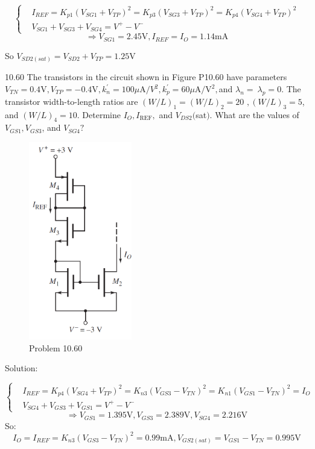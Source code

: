 \documentclass[a4paper,11pt,UTF8]{article}
\begin{document}
$$\left\{
\begin{aligned}
	&I_{REF}=K_{p1}(V_{SG1}+V_{TP})^2=K_{p3}(V_{SG3}+V_{TP})^2=K_{p4}(V_{SG4}+V_{TP})^2\\
	&V_{SG1}+V_{SG3}+V_{SG4}=V^+-V^-
\end{aligned}\right.
$$
$$
	\Rightarrow V_{SG1}=2.45\mathrm{V},I_{REF}=I_O=1.14\mathrm{mA}
$$

So $V_{SD2(sat)}=V_{SD2}+V_{TP}=1.25$V

10.60 The transistors in the circuit shown in Figure P10.60 have parameters $V_{TN}= 0.4$V$, V_{TP}= - 0.4$V$, k_n^{\prime}= 100\mu$A$/V^2, k_{p}^{\prime}= 60\mu$A$/\mathrm{V} ^2, $and $\lambda_n=\:\lambda_p=0.$ The transistor width-to-length ratios are $(W/L)_1=(W/L)_{2}=20$  $,(W/L)_{3}=5$, and $(W/L)_{4}=10$. Determine  $I_{O}, I_{\mathrm{REF}}, $ and $V_{DS2}( $sat$) .$ What are the values of$V_{GS1}, V_{GS3}$, and $V_{SG4}?$
\begin{figure}[H]
	\centering
	\includegraphics[width=0.4\textwidth]{10.60}
	\caption{Problem 10.60}
\end{figure}
\noindent Solution:

$$\left\{\begin{aligned}
	&I_{REF}=K_{p4}(V_{SG4}+V_{TP})^2=K_{n3}(V_{GS3}-V_{TN})^2=K_{n1}(V_{GS1}-V_{TN})^2=I_O\\
	&V_{SG4}+V_{GS3}+V_{GS1}=V^+-V^-
\end{aligned}\right.
$$
$$	
	\Rightarrow V_{GS1}=1.395\mathrm{V} ,V_{GS3} =2.389\mathrm{V},V_{SG4}=2.216\mathrm{V}
$$
So:
$$
	I_O=I_{REF}=K_{n3}(V_{GS3}-V_{TN})^2=0.99\mathrm{mA}, V_{GS2(sat)}=V_{GS1}-V_{TN}=0.995\mathrm{V}
$$
\end{document}
